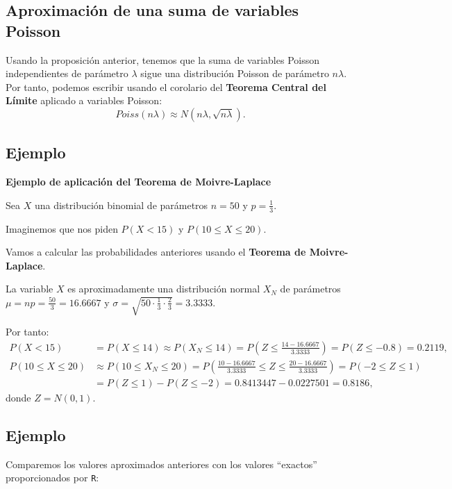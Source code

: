 \documentclass[]{book}
\begin{document}
\hypertarget{aproximaciuxf3n-de-una-suma-de-variables-poisson-3}{%
\subsection{Aproximación de una suma de variables Poisson}\label{aproximaciuxf3n-de-una-suma-de-variables-poisson-3}}

Usando la proposición anterior, tenemos que la suma de variables Poisson independientes de parámetro \(\lambda\) sigue una distribución Poisson de parámetro \(n\lambda\). Por tanto, podemos escribir usando el corolario del \textbf{Teorema Central del Límite} aplicado a variables Poisson:
\[
Poiss(n\lambda)\approx N(n\lambda,\sqrt{n\lambda}).
\]

\hypertarget{ejemplo-152}{%
\subsection{Ejemplo}\label{ejemplo-152}}

\textbf{Ejemplo de aplicación del Teorema de Moivre-Laplace}

Sea \(X\) una distribución binomial de parámetros \(n=50\) y \(p=\frac{1}{3}\).

Imaginemos que nos piden \(P(X < 15)\) y \(P(10\leq X\leq 20)\).

Vamos a calcular las probabilidades anteriores usando el \textbf{Teorema de Moivre-Laplace}.

La variable \(X\) es aproximadamente una distribución normal \(X_N\) de parámetros \(\mu = np=\frac{50}{3}=16.6667\) y \(\sigma=\sqrt{50\cdot\frac{1}{3}\cdot \frac{2}{3}}=3.3333\).

Por tanto:
\[
\begin{array}{rl}
P(X< 15) & = P(X\leq 14) \approx P(X_N \leq 14)=P\left(Z\leq \frac{14-16.6667}{3.3333}\right) =P(Z\leq -0.8) = 0.2119,\\
P(10\leq X\leq 20) & \approx P(10\leq X_N \leq 20) = P\left(\frac{10-16.6667}{3.3333}\leq  Z\leq \frac{20-16.6667}{3.3333}\right) = P(-2\leq Z\leq 1) \\ & = P(Z\leq 1)-P(Z\leq -2)=0.8413447-0.0227501 = 0.8186,
\end{array}
\]
donde \(Z=N(0,1)\).

\hypertarget{ejemplo-153}{%
\subsection{Ejemplo}\label{ejemplo-153}}

Comparemos los valores aproximados anteriores con los valores ``exactos'' proporcionados por \texttt{R}:
\end{document}
